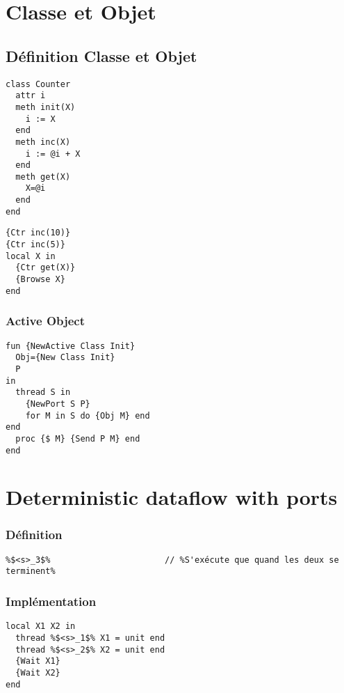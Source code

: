 \documentclass{report}
\begin{document}
\section{Classe et Objet}
\subsection{Définition Classe et Objet}
\begin{lstlisting}[escapechar=\%]
class Counter 
  attr i 
  meth init(X) 
    i := X
  end 
  meth inc(X) 
    i := @i + X
  end 
  meth get(X) 
    X=@i
  end
end
\end{lstlisting}
\begin{lstlisting}[escapechar=\%]
{Ctr inc(10)} 
{Ctr inc(5)} 
local X in 
  {Ctr get(X)} 
  {Browse X}
end
\end{lstlisting}

\subsubsection{Active Object}
\begin{lstlisting}[escapechar=\%]
fun {NewActive Class Init} 
  Obj={New Class Init} 
  P
in
  thread S in 
    {NewPort S P} 
    for M in S do {Obj M} end
end 
  proc {$ M} {Send P M} end
end
\end{lstlisting}

\section{Deterministic dataflow with ports}
\subsubsection*{Définition}
\begin{lstlisting}[escapechar=\%]
%$(<s>_1 \parallel <s>_2)$%  	 // %Crée deux threads et attend que les deux se terminent%
%$<s>_3$%						// %S'exécute que quand les deux se terminent%
\end{lstlisting}

\subsubsection*{Implémentation}
\begin{lstlisting}[escapechar=\%]
local X1 X2 in
  thread %$<s>_1$% X1 = unit end
  thread %$<s>_2$% X2 = unit end
  {Wait X1}
  {Wait X2}
end
\end{lstlisting}
\end{document}

